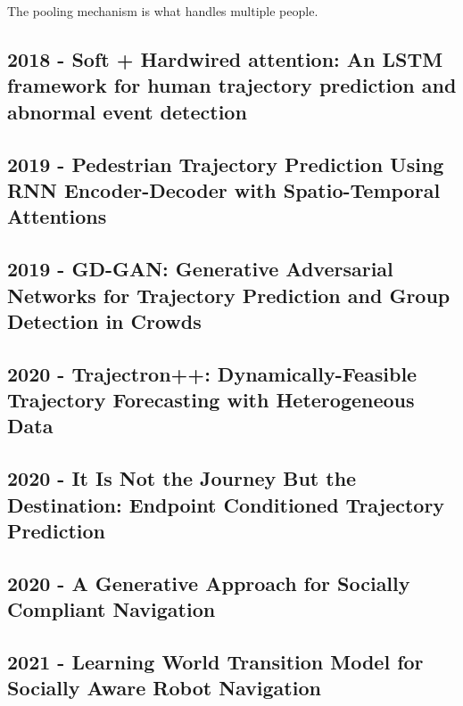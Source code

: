 The pooling mechanism is what handles multiple people.

\subsection*{2018 - Soft + Hardwired attention: An LSTM framework for human trajectory prediction and abnormal event detection}

\cite{fernando2018soft+}

\subsection*{2019 - Pedestrian Trajectory Prediction Using RNN Encoder-Decoder with Spatio-Temporal Attentions}

\cite{bhujel2019pedestrian}

\subsection*{2019 - GD-GAN: Generative Adversarial Networks for Trajectory Prediction and Group Detection in Crowds}

\cite{fernando2019gd}

\subsection*{2020 - Trajectron++: Dynamically-Feasible Trajectory Forecasting with Heterogeneous Data}

\cite{salzmann2020trajectron++}

\subsection*{2020 - It Is Not the Journey But the Destination: Endpoint Conditioned Trajectory Prediction}

\cite{mangalam2020not}

\subsection*{2020 - A Generative Approach for Socially Compliant Navigation}

\cite{tsai2020generative}

\subsection*{2021 - Learning World Transition Model for Socially Aware Robot Navigation}

